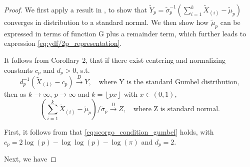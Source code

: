 \begin{proof}
	We first apply a result in , to show that $\tilde{Y}_p=\tilde{\sigma}_p^{-1}(\sum_{i=1}^{k} \tilde{X}_{(i)}-\tilde{\mu}_p)$ converges in distribution to a standard normal. We then show how $\tilde{\mu}_p$ can be expressed in terms of function G plus a remainder term, which further leads to expression \eqref{eq:ydf/2p_representation}. 
	
	It follows from  Corollary 2, that if there exist centering and normalizing constants $c_p$ and $d_p>0$, s.t.
	\begin{equation}
	d_p^{-1}(\tilde{X}_{(1)} - c_p) \xrightarrow{D} Y, \quad \text{where Y is the standard Gumbel distribution},
	\label{eq:scorgo_condition_gumbel} 
	\end{equation}
	then as $k \to \infty$, $p \to \infty$ and $k=\left \lfloor{px}\right \rfloor$ with $x \in (0,1)$,
	\begin{equation}
	\left(\sum_{i=1}^k \tilde{X}_{(i)}  - \tilde{\mu}_p\right) / \tilde{\sigma}_p \xrightarrow{D} Z, \quad \text{where Z is standard normal}.
	\label{eq:scorgo_result}
	\end{equation}
	
	First, it follows from  that \eqref{eq:scorgo_condition_gumbel} holds, with $c_p=2\log(p)-\log\log(p)-\log(\pi)$ and $d_p=2$.
	\iffalse
	the maxima of $p$ gamma-distributed random variables, $\gamma(\alpha,\beta)$ with $\beta$ being the rate parameter, converges to a Gumbel distribution as $p \to \infty$, where the centering constant $c_p=\beta^{-1}(\log(p) +(\alpha-1)\log\log(p) - \log(\gamma(\alpha)))$, and the scaling constant $d_p=\beta^{-1}$. Meanwhile, we know that $\chi^2_1$ is a $\gamma(1/2,1/2)$ distribution. Therefore, \eqref{eq:scorgo_condition_gumbel} holds, where $c_p=2\log(p)-\log\log(p)-\log(\pi)$ and $d_p=2$.
	\fi
	
	Next, we have
	

\end{proof}
